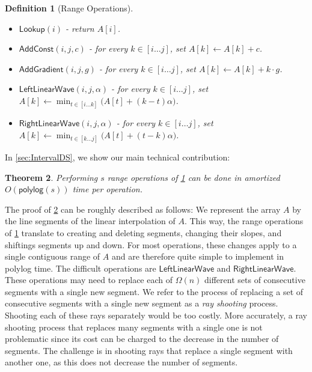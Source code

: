 \documentclass[10pt,a4paper]{article}
\newtheorem{theorem}{Theorem}[section]
\newtheorem{definition}[theorem]{Definition}
\newcommand{\AC}{\mathsf{AddConst}}
\newcommand{\AG}{\mathsf{AddGradient}}
\newcommand{\LLW}{\mathsf{LeftLinearWave}}
\newcommand{\RLW}{\mathsf{RightLinearWave}}
\newcommand{\Lookup}{\mathsf{Lookup}}
\newcommand{\polylog}{\mathsf{polylog}}
\begin{document}
\begin{definition}[Range Operations]\label{def:rangeops}
\
\begin{itemize}
    \item $\Lookup(i)$ - return $A[i]$.
    \item $\AC(i,j,c)$ -  for every $k\in [i\ldots j]$, set $A[k] \leftarrow A[k]+c$.
    \item $\AG(i,j,g)$ - for every $k\in [i\ldots j]$, set $A[k] \leftarrow A[k]+ k \cdot g$.
    \item $\LLW(i,j,\alpha)$ - for every $k\in [i\ldots j]$, set $A[k] \leftarrow \min_{t \in [i\ldots k]} \big(A[t] + (k-t)\alpha \big)$. 
    \item $\RLW(i,j,\alpha)$ - for every $k\in [i\ldots j]$, set  $A[k] \leftarrow \min_{t \in [k\ldots j]} \big(A[t] + (t-k)\alpha \big)$.
\end{itemize}

\end{definition}

In \cref{sec:IntervalDS}, we show our main technical contribution:  

\begin{theorem}\label{t:mainds}
Performing $s$ range operations of \cref{def:rangeops} can be done in amortized $O(\polylog (s))$ time per operation.
\end{theorem}

The proof of \cref{t:mainds} can be roughly described as follows: We represent the array $A$ by the line segments of the linear interpolation of $A$.
This way, the range operations of \cref{def:rangeops} translate to creating and deleting segments, changing their slopes, and shiftings segments up and down. For most operations, these changes apply to a single contiguous range of $A$ and are therefore quite simple to implement in polylog time. 
The difficult operations are $\LLW$ and $\RLW$. These operations may need to replace each of $\Omega(n)$ different sets of consecutive segments with a single new segment. We refer to the process of replacing  a set of consecutive segments with a single new segment as a {\em ray shooting} process.
Shooting each of these rays separately would be too costly.
More accurately, a ray shooting process that replaces many segments with a single one is not problematic since its cost can be charged to the decrease in the number of segments.
The challenge is in shooting rays that replace a single segment with another one, as this does not decrease the number of segments. 
\end{document}
